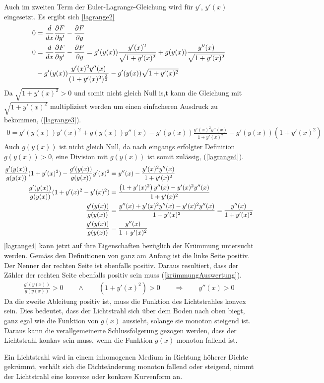 Auch im zweiten Term der Euler-Lagrange-Gleichung wird für $y'$, $y'(x)$ eingesetzt. Es ergibt sich \eqref{lagrange2}
\begin{align}
	0 &= \frac{d}{dx} \frac{\partial F}{\partial y'} - \frac{\partial F}{\partial y} \label{lagrangePrinzip} \\
		0 &= \frac{d}{dx} \frac{\partial F}{\partial y'} - \frac{\partial F}{\partial y}
	= g'(y(x)) \frac{y'(x)^2}{\sqrt{1 + y'(x)^2}} + g(y(x)) \frac{y''(x)}{\sqrt{1 + y'(x)^2}} \notag \\
	&- g'(y(x)) \frac{y'(x)^2 y''(x)}{(1 + y'(x)^2)^\frac{3}{2}}  - g'(y(x)) \sqrt{1 + y'(x)^2}
	\label{lagrange2}
\end{align}
Da $\sqrt{1 + y'(x)^2} > 0$ und somit nicht gleich Null is,t kann die Gleichung mit $\sqrt{1 + y'(x)^2}$  multipliziert werden um einen einfacheren Ausdruck zu bekommen, (\eqref{lagrange3}).
\begin{align}
	0 = g'(y(x)) y'(x)^2 + g(y(x)) y''(x) - g'(y(x)) \frac{y'(x)^2 y''(x)}{1 + y'(x)^2} - g'(y(x)) (1 + y'(x)^2)
	\label{lagrange3}
\end{align}
Auch $g(y(x))$ ist nicht gleich Null, da nach eingangs erfolgter Definition $g(y(x)) > 0$, eine Division mit $g(y(x))$ ist somit zulässig, (\eqref{lagrange4}).
\begin{align}
	\frac{g'(y(x))}{g(y(x))} (1 + y'(x)^2) - \frac{g'(y(x))}{g(y(x))} y'(x)^2 &=  y''(x) - \frac{y'(x)^2 y''(x)}{1 + y'(x)^2} \notag \\
	\frac{g'(y(x))}{g(y(x))} (1 + y'(x)^2 - y'(x)^2) &= \frac{\left(1 + y'(x)^2 \right)y''(x) - y'(x)^2 y''(x)}{1 + y'(x)^2} \notag \\
	\frac{g'(y(x))}{g(y(x))} &= \frac{y''(x) + y'(x)^2 y''(x) - y'(x)^2 y''(x)}{1 + y'(x)^2} = \frac{y''(x)}{1 + y'(x)^2}\notag \\
	\frac{g'(y(x))}{g(y(x))} &= \frac{y''(x)}{1 + y'(x)^2}
	\label{lagrange4}
\end{align}
\eqref{lagrange4} kann jetzt auf ihre Eigenschaften bezüglich der Krümmung untersucht werden. Gemäss den Definitionen von ganz am Anfang ist die linke Seite positiv. 
Der Nenner der rechten Seite ist ebenfalls positiv. Daraus resultiert, dass der Zähler der rechten Seite ebenfalls positiv sein muss (\eqref{krümmungAuswertung}).
\begin{align}
	\frac{g'(y(x))}{g(y(x))} > 0 \qquad \wedge \qquad (1 + y'(x)^2) > 0 \qquad \Rightarrow \qquad y''(x) > 0
	\label{krümmungAuswertung}
\end{align}
Da die zweite Ableitung positiv ist, muss die Funktion des Lichtstrahles konvex sein.
Dies bedeutet, dass der Lichtstrahl sich über dem Boden nach oben biegt, ganz egal wie die Funktion von $g(x)$ aussieht, solange sie monoton steigend ist.
Daraus kann die verallgemeinerte Schlussfolgerung gezogen werden, dass der Lichtstrahl konkav sein muss, wenn die Funktion $g(x)$ monoton fallend ist.
\begin{satz}
Ein Lichtstrahl wird in einem inhomogenen Medium in Richtung höherer Dichte gekrümmt, verhält sich die Dichteänderung monoton fallend oder steigend, nimmt der Lichtstrahl eine konvexe oder konkave Kurvenform an.
\end{satz}
